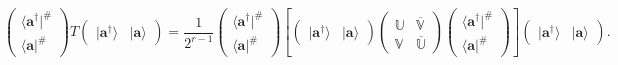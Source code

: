 \documentclass[aps, preprint]{revtex4}
\begin{document}
\begin{equation}\left (\begin{array}{c} \langle \mathbf{a}^{ \dag }\vert ^{\#} \\
 \langle \mathbf{a}\vert ^{\#}\end{array}\right ) T \left (\begin{array}{cc}\vert \mathbf{a}^{ \dag } \rangle  & \vert \mathbf{a} \rangle \end{array}\right ) =\frac{1}{2^{r -1}} \left (\begin{array}{c} \langle \mathbf{a}^{ \dag }\vert ^{\#} \\
 \langle \mathbf{a}\vert ^{\#}\end{array}\right ) \left [\left (\begin{array}{cc}\vert \mathbf{a}^{ \dag } \rangle  & \vert \mathbf{a} \rangle \end{array}\right ) \left (\begin{array}{cc}\mathbb{U} & \overline{\mathbb{V}} \\
\mathbb{V} & \overline{\mathbb{U}}\end{array}\right ) \left (\begin{array}{c} \langle \mathbf{a}^{ \dag }\vert ^{\#} \\
 \langle \mathbf{a}\vert ^{\#}\end{array}\right )\right ] \left (\begin{array}{cc}\vert \mathbf{a}^{ \dag } \rangle  & \vert \mathbf{a} \rangle \end{array}\right )\text{.}
\end{equation}
\end{document}
